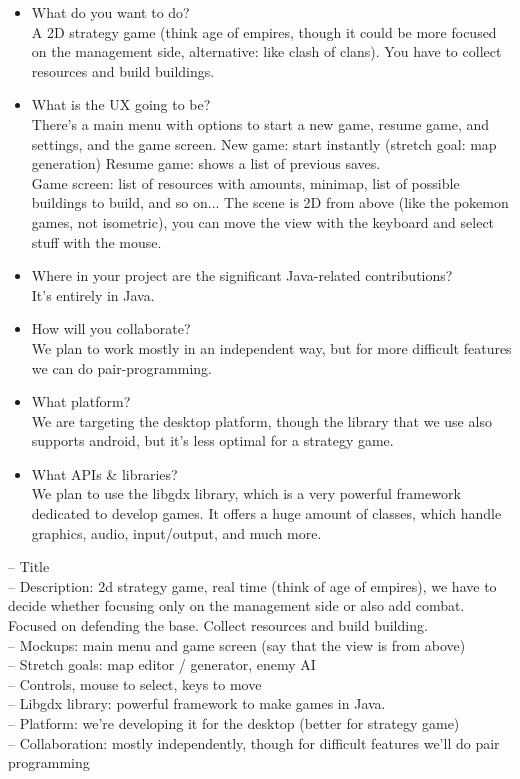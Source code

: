 \documentclass{article}
\begin{document}
  \begin{itemize}
    \item What do you want to do?\\
    A 2D strategy game (think age of empires, though it could be more focused on the management side, alternative: like clash of clans). You have to collect resources and build buildings.

    \item What is the UX going to be?\\
    There's a main menu with options to start a new game, resume game, and settings, and the game screen.
    New game: start instantly (stretch goal: map generation)
    Resume game: shows a list of previous saves.\\
    Game screen: list of resources with amounts, minimap, list of possible buildings to build, and so on...
    The scene is 2D from above (like the pokemon games, not isometric), you can move the view with the keyboard and select stuff with the mouse.

    \item Where in your project are the significant Java-related contributions?\\
    It's entirely in Java.

    \item How will you collaborate?\\
    We plan to work mostly in an independent way, but for more difficult features we can do pair-programming.

    \item What platform?\\
    We are targeting the desktop platform, though the library that we use also supports android, but it's less optimal for a strategy game.

    \item What APIs \& libraries?\\
    We plan to use the libgdx library, which is a very powerful framework dedicated to develop games. It offers a huge amount of classes, which handle graphics, audio, input/output, and much more.
  \end{itemize}


  -- Title\\
  -- Description: 2d strategy game, real time (think of age of empires), we have to decide whether focusing only on the management side or also add combat. Focused on defending the base. Collect resources and build building.\\
  -- Mockups: main menu and game screen (say that the view is from above)\\
  -- Stretch goals: map editor / generator, enemy AI\\
  -- Controls, mouse to select, keys to move\\
  -- Libgdx library: powerful framework to make games in Java.\\
  -- Platform: we're developing it for the desktop (better for strategy game)\\
  -- Collaboration: mostly independently, though for difficult features we'll do pair programming\\
\end{document}
